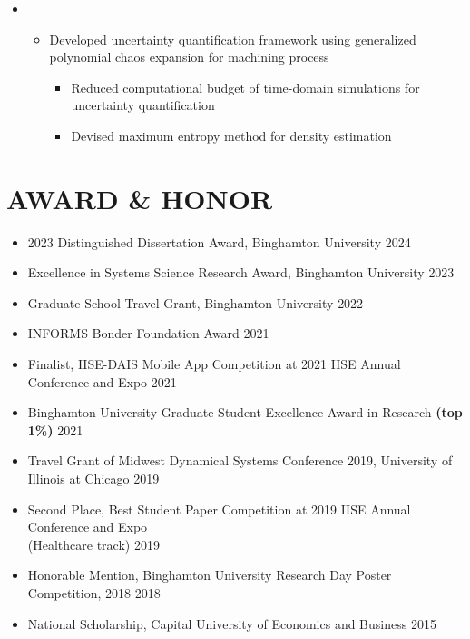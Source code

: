 \documentclass[10pt]{article}
\begin{document}
\begin{itemize}
\begin{itemize}[label=$\bullet$]
		\item {}
		\begin{itemize}[label=$\bullet$]
		    \item Developed uncertainty quantification framework using generalized polynomial chaos expansion for machining process 
		    \begin{itemize}[label=$-$]
		    \item Reduced computational budget of time-domain simulations for uncertainty quantification
		    \item Devised maximum entropy method for density estimation  
		    \end{itemize}
		\end{itemize}
	\end{itemize}
\end{itemize}


\section*{AWARD \& HONOR}
\begin{itemize}
	\item 2023 Distinguished Dissertation Award, Binghamton University
	\hfill{2024}
    \item Excellence in Systems Science Research Award, Binghamton University
	\hfill{2023}
    \item Graduate School Travel Grant, Binghamton University
	\hfill{2022}
	\item INFORMS Bonder Foundation Award
	\hfill{2021}
	\item Finalist, IISE-DAIS Mobile App Competition at 2021 IISE Annual Conference and Expo
	\hfill{2021}
	\item Binghamton University Graduate Student Excellence Award in Research \textbf{(top 1\%)}
	\hfill{2021}
	\item Travel Grant of Midwest Dynamical Systems Conference 2019, University of Illinois at Chicago 
	\hfill{2019}
	\item Second Place, Best Student Paper Competition at 2019 IISE Annual Conference and Expo \\(Healthcare track)
	\hfill{2019}
	\item Honorable Mention, Binghamton University Research Day Poster Competition, 2018
	\hfill{2018}
	\item National Scholarship, Capital University of Economics and Business
	\hfill{2015}
\end{itemize}
\end{document}
